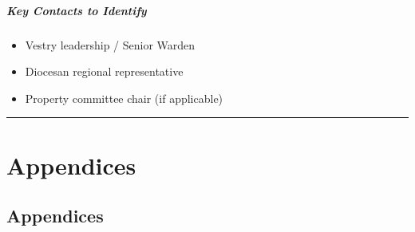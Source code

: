 \documentclass[
  letterpaper,
  DIV=11,
  numbers=noendperiod,
  oneside]{scrreprt}
\providecommand{\tightlist}{%
  \setlength{\itemsep}{0pt}\setlength{\parskip}{0pt}}
\begin{document}
\subsubsection{Key Contacts to
Identify}\label{key-contacts-to-identify-7}

\begin{itemize}
\tightlist
\item[$\square$]
  Vestry leadership / Senior Warden
\item[$\square$]
  Diocesan regional representative
\item[$\square$]
  Property committee chair (if applicable)
\end{itemize}

\begin{center}\rule{0.5\linewidth}{0.5pt}\end{center}

\part{Appendices}

\chapter*{Appendices}\label{appendices-1}

\end{document}
